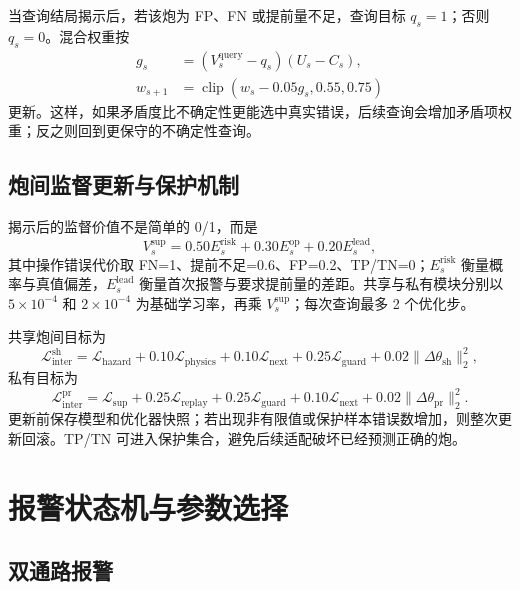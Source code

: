 当查询结局揭示后，若该炮为 FP、FN 或提前量不足，查询目标 $q_s=1$；否则 $q_s=0$。混合权重按
\begin{align}
g_s&=(V_s^{\mathrm{query}}-q_s)(U_s-C_s),\\
w_{s+1}&=\operatorname{clip}(w_s-0.05g_s,0.55,0.75)
\end{align}
更新。这样，如果矛盾度比不确定性更能选中真实错误，后续查询会增加矛盾项权重；反之则回到更保守的不确定性查询。

\subsection{炮间监督更新与保护机制}

揭示后的监督价值不是简单的 0/1，而是
\begin{equation}
V_s^{\mathrm{sup}}=0.50E_s^{\mathrm{risk}}+0.30E_s^{\mathrm{op}}+0.20E_s^{\mathrm{lead}},
\label{eq:supervision-value}
\end{equation}
其中操作错误代价取 FN=1、提前不足=0.6、FP=0.2、TP/TN=0；$E_s^{\mathrm{risk}}$ 衡量概率与真值偏差，$E_s^{\mathrm{lead}}$ 衡量首次报警与要求提前量的差距。共享与私有模块分别以 $5\times10^{-4}$ 和 $2\times10^{-4}$ 为基础学习率，再乘 $V_s^{\mathrm{sup}}$；每次查询最多 2 个优化步。

共享炮间目标为
\begin{equation}
\mathcal L_{\mathrm{inter}}^{\mathrm{sh}}=
\mathcal L_{\mathrm{hazard}}+0.10\mathcal L_{\mathrm{physics}}
+0.10\mathcal L_{\mathrm{next}}+0.25\mathcal L_{\mathrm{guard}}
+0.02\lVert\Delta\theta_{\mathrm{sh}}\rVert_2^2,
\end{equation}
私有目标为
\begin{equation}
\mathcal L_{\mathrm{inter}}^{\mathrm{pr}}=
\mathcal L_{\mathrm{sup}}+0.25\mathcal L_{\mathrm{replay}}
+0.25\mathcal L_{\mathrm{guard}}+0.10\mathcal L_{\mathrm{next}}
+0.02\lVert\Delta\theta_{\mathrm{pr}}\rVert_2^2.
\end{equation}
更新前保存模型和优化器快照；若出现非有限值或保护样本错误数增加，则整次更新回滚。TP/TN 可进入保护集合，避免后续适配破坏已经预测正确的炮。

\section{报警状态机与参数选择}

\subsection{双通路报警}

